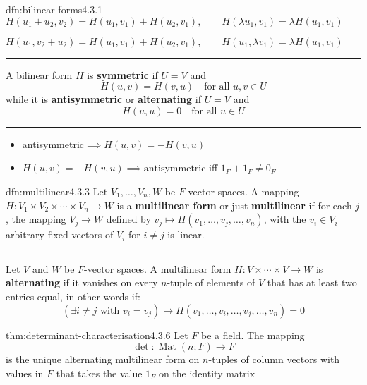 \documentclass[landscape, 8pt]{extarticle}
\DeclareMathOperator{\Mat}{Mat}
\begin{document}
\begin{multicols}{3}
\begin{dfn}{dfn:bilinear-forms}{4.3.1}
    \vspace{5pt}
        $H(u_{1} + u_{2}, v_{2}) = H(u_{1}, v_{1}) + H(u_{2}, v_{1}), \qquad H(\lambda u_{1}, v_{1}) = \lambda H(u_{1}, v_{1})$

        $H(u_{1}, v_{2} + u_{2}) = H(u_{1}, v_{1}) + H(u_{2}, v_{1}), \qquad H(u_{1},\lambda v_{1}) = \lambda H(u_{1}, v_{1})$
    \vspace{5pt}
    \noindent\rule{\textwidth}{0.2pt}
    \vspace{-10pt}
    A bilinear form $H$ is \textbf{symmetric} if $U = V$ and
    \vspace{7pt}
    \[H(u,v) = H(v,u)\quad \text{for all } u,v\in U\]
    while it is \textbf{antisymmetric} or \textbf{alternating} if $U = V$ and
    \[H(u, u) = 0 \quad\text{for all } u\in U\]

    \vspace{-7pt}
    \noindent\rule{\textwidth}{0.2pt}
    \vspace{-10pt}
    \begin{itemize}[leftmargin=*]
        \item antisymmetric$\implies H(u, v) = -H(v, u)$
        \item $H(u, v) = -H(v, u) \implies \text{antisymmetric}$ iff $1_{F} + 1_{F} \ne 0_{F}$
    \end{itemize}
\end{dfn}

\vspace{-5pt}
\begin{dfn}{dfn:multilinear}{4.3.3}
    \vspace{-5pt}
    Let $V_{1},\dots,V_{n}, W$ be $F$-vector spaces. A mapping $H : V_{1} \times V_{2} \times \cdots \times V_{n} \to W$ is a \textbf{multilinear form} or just \textbf{multilinear} if for each $j$, the mapping $V_{j}\to W$ defined by $v_{j}\mapsto H(v_{1},\dots,v_{j},\dots,v_{n})$, with the $v_{i}\in V_{i}$ arbitrary fixed vectors of $V_{i}$ for $i\ne j$ is linear. 

    \noindent\rule{\textwidth}{0.2pt}
    Let $V$ and $W$ be $F$-vector spaces. A multilinear form $ H : V \times \cdots \times V \to W$ is \textbf{alternating} if it vanishes on every $n$-tuple of elements of $V$ that has at least two entries equal, in other words if:
    \[(\exists i\ne j \text{ with } v_{i} = v_{j})\to H(v_{1},\dots,v_{i},\dots,v_{j},\dots,v_{n}) = 0\]
\end{dfn}

\newpage
\begin{thm}{thm:determinant-characterisation}{4.3.6}
    \vspace{-5pt}
    Let $F$ be a field. The mapping
    \[\det : \Mat(n;F) \to F\]
    is the unique alternating multilinear form on $n$-tuples of column vectors with values in $F$ that takes the value $1_{F}$ on the identity matrix
\end{thm}


\end{multicols}
\end{document}
